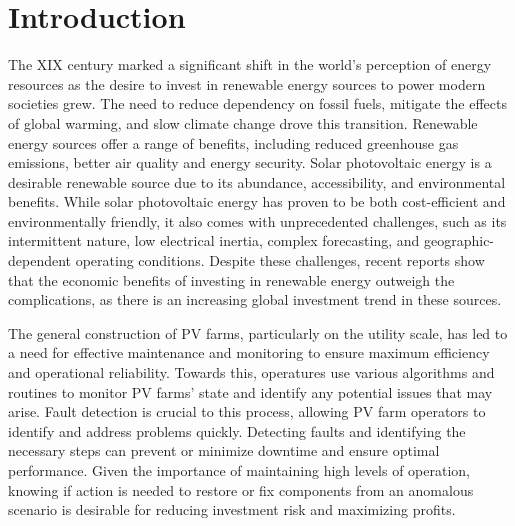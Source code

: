 \chapter{Introduction} \label{chap:chap1}


The XIX century marked a significant shift in the world's perception of energy resources as the desire to invest in renewable energy sources to power modern societies grew. The need to reduce dependency on fossil fuels, mitigate the effects of global warming, and slow climate change drove this transition. Renewable energy sources offer a range of benefits, including reduced greenhouse gas emissions, better air quality and energy security. Solar photovoltaic energy is a desirable renewable source due to its abundance, accessibility, and environmental benefits. While solar photovoltaic energy has proven to be both cost-efficient and environmentally friendly, it also comes with unprecedented challenges, such as its intermittent nature, low electrical inertia, complex forecasting, and geographic-dependent operating conditions. Despite these challenges, recent reports \cite{cap} show that the economic benefits of investing in renewable energy outweigh the complications, as there is an increasing global investment trend in these sources.

The general construction of PV farms, particularly on the utility scale, has led to a need for effective maintenance and monitoring to ensure maximum efficiency and operational reliability. Towards this, operatures use various algorithms and routines to monitor PV farms' state and identify any potential issues that may arise. Fault detection is crucial to this process, allowing PV farm operators to identify and address problems quickly. Detecting faults and identifying the necessary steps can prevent or minimize downtime and ensure optimal performance. Given the importance of maintaining high levels of operation, knowing if action is needed to restore or fix components from an anomalous scenario is desirable for reducing investment risk and maximizing profits.

